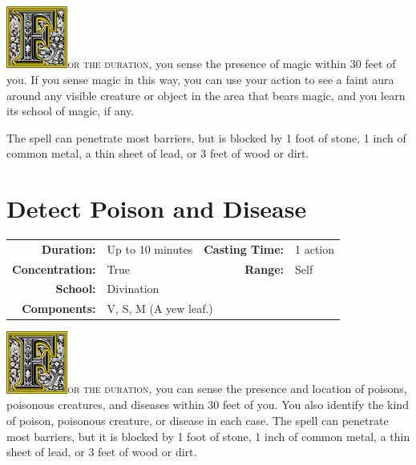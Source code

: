 \documentclass[12pt,showtrims]{memoir}
\begin{document}
\vspace{1\baselineskip}\noindent
\lettrine[lines=4]{\includegraphics[height=58pt]{initials/F.png}}{or the duration}, you sense the presence of magic within 30 feet of you. If you sense magic in this way, you can use your action to see a faint aura around any visible creature or object in the area that bears magic, and you learn its school of magic, if any.

The spell can penetrate most barriers, but is blocked by 1 foot of stone, 1 inch of common metal, a thin sheet of lead, or 3 feet of wood or dirt.

\newpage
\section*{Detect Poison and Disease}

{
\small\centering\vspace{-6pt}
\begin{tabular}{rlrl}
\toprule

\textbf{Duration:} & Up to 10 minutes &
\textbf{Casting Time:} & 1 action \\
\textbf{Concentration:} & True &
\textbf{Range:} & Self \\
\textbf{School:} & Divination \\
\textbf{Components:} & \multicolumn{3}{p{0.7\textwidth}}{V, S, M (A yew leaf.)}\\

\bottomrule
\end{tabular}
}

\vspace{1\baselineskip}\noindent
\lettrine[lines=4]{\includegraphics[height=58pt]{initials/F.png}}{or the duration}, you can sense the presence and location of poisons, poisonous creatures, and diseases within 30 feet of you. You also identify the kind of poison, poisonous creature, or disease in each case. The spell can penetrate most barriers, but it is blocked by 1 foot of stone, 1 inch of common metal, a thin sheet of lead, or 3 feet of wood or dirt.
\end{document}
